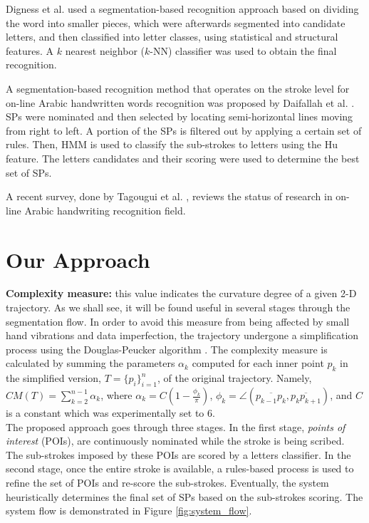 \documentclass[10pt, conference, compsocconf]{IEEEtran}
\begin{document}
Digness et al. \cite{Dinges2011} used a segmentation-based recognition approach based on dividing the word into smaller pieces, which were afterwards segmented into candidate letters, and then classified into letter classes, using statistical and structural features. 
A $k$ nearest neighbor ($k$-NN) classifier was used to obtain the final recognition.

A segmentation-based recognition method that operates on the stroke level for on-line Arabic handwritten words recognition was proposed by Daifallah et al. \cite{daifallah2009recognition}. 
SPs were nominated and then selected by locating semi-horizontal lines moving from right to left. 
A portion of the SPs is filtered out by applying a certain set of rules. 
Then, HMM is used to classify the sub-strokes to letters using the Hu feature. 
The letters candidates and their scoring were used to determine the best set of SPs.

A recent survey, done by Tagougui et al. \cite{tagougui2013online}, reviews the status of research in on-line Arabic handwriting recognition field. 

\section{Our Approach}
\label{sec:approach}

\textbf{Complexity measure:} this value indicates the curvature degree of a given 2-D trajectory. 
As we shall see, it will be found useful in several stages through the segmentation flow.
In order to avoid this measure from being affected by small hand vibrations and data imperfection, the trajectory undergone a simplification process using the Douglas-Peucker algorithm \cite{douglas1973algorithms}.
The complexity measure is calculated by summing the parameters $\alpha_{k}$ computed for each inner point $p_k$ in the simplified version, $T=\{p_i\}_{i=1}^{n}$, of the original trajectory.
Namely, $CM(T)=\sum_{k=2}^{n-1}{\alpha_k}$, where $\alpha_{k}=C(1-\frac{\phi_k}{\pi})$, $\phi_k=\angle(\overline{p_{k-1}p_{k}},\overline{p_{k}p_{k+1}})$, and $C$ is a constant which was experimentally set to 6.\\

The proposed approach goes through three stages. 
In the first stage, \emph{points of interest} (POIs), are continuously nominated while the stroke is being scribed.
The sub-strokes imposed by these POIs are scored by a letters classifier. 
In the second stage, once the entire stroke is available, a rules-based process is used to refine the set of POIs and re-score the sub-strokes. 
Eventually, the system heuristically determines the final set of SPs based on the sub-strokes scoring. The system flow is demonstrated in Figure \ref{fig:system_flow}. 
\end{document}
